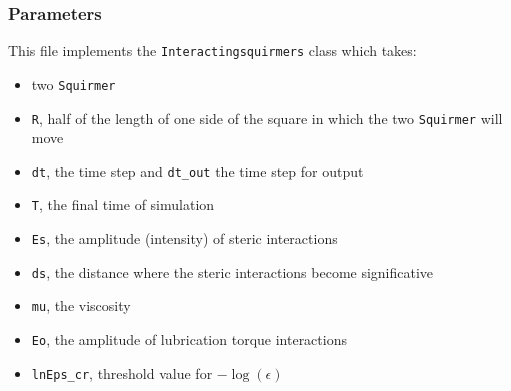 \documentclass{article}
\begin{document}
\subsubsection*{Parameters}
This file implements the \texttt{Interactingsquirmers} class which takes:
\begin{itemize}
   \item two \texttt{Squirmer}
   \item \texttt{R}, half of the length of one side of the square in which the two \texttt{Squirmer} will move
   \item \texttt{dt}, the time step and \texttt{dt\_out} the time step for output
   \item \texttt{T}, the final time of simulation
   \item \texttt{Es}, the amplitude (intensity) of steric interactions
   \item \texttt{ds}, the distance where the steric interactions become significative
   \item \texttt{mu}, the viscosity
   \item \texttt{Eo}, the amplitude of lubrication torque interactions
   \item \texttt{lnEps\_cr}, threshold value for \( -\log(\epsilon) \)
\end{itemize}
\end{document}

